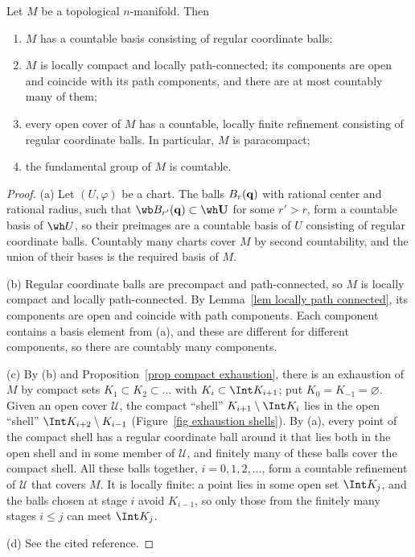 \begin{thm}\label{thm properties of manifolds}
    Let $M$ be a topological $n$-manifold. Then
    \begin{enumerate}[label=(\alph*)]
        \item $M$ has a countable basis consisting of regular coordinate balls;
        \item $M$ is locally compact and locally path-connected; its components are open and coincide with its path components, and there are at most countably many of them;
        \item every open cover of $M$ has a countable, locally finite refinement consisting of regular coordinate balls. In particular, $M$ is paracompact;
        \item the fundamental group of $M$ is countable.
    \end{enumerate}
\end{thm}
\begin{proof}
    (a) Let $(U,\varphi)$ be a chart. The balls $B_r(\bf{q})$ with rational center and rational radius, such that $\wb B_{r'}(\bf{q})\subset\wh U$ for some $r'>r$, form a countable basis of $\wh U$, so their preimages are a countable basis of $U$ consisting of regular coordinate balls. Countably many charts cover $M$ by second countability, and the union of their bases is the required basis of $M$.

    (b) Regular coordinate balls are precompact and path-connected, so $M$ is locally compact and locally path-connected. By Lemma~\ref{lem locally path connected}, its components are open and coincide with path components. Each component contains a basis element from (a), and these are different for different components, so there are countably many components.

    (c) By (b) and Proposition~\ref{prop compact exhaustion}, there is an exhaustion of $M$ by compact sets $K_1\subset K_2\subset\ldots$ with $K_i\subset\Int K_{i+1}$; put $K_0=K_{-1}=\varnothing$. Given an open cover $\mathcal{U}$, the compact ``shell'' $K_{i+1}\setminus\Int K_i$ lies in the open ``shell'' $\Int K_{i+2}\setminus K_{i-1}$ (Figure~\ref{fig exhaustion shells}). By (a), every point of the compact shell has a regular coordinate ball around it that lies both in the open shell and in some member of $\mathcal{U}$, and finitely many of these balls cover the compact shell. All these balls together, $i=0,1,2,\ldots$, form a countable refinement of $\mathcal U$ that covers $M$. It is locally finite: a point lies in some open set $\Int K_{j}$, and the balls chosen at stage $i$ avoid $K_{i-1}$, so only those from the finitely many stages $i\leq j$ can meet $\Int K_j$.

    (d) See the cited reference.
\end{proof}

